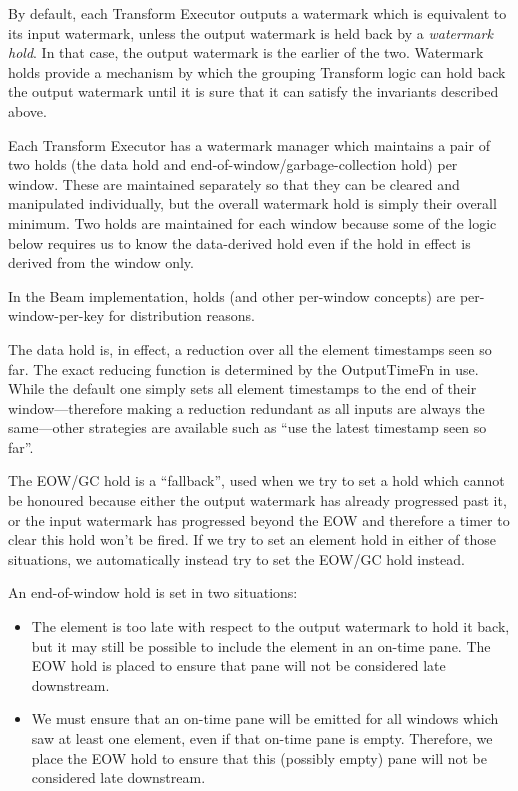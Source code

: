 By default, each Transform Executor outputs a watermark which is equivalent to its input watermark, unless the output watermark is held back by a \emph{watermark hold}.
In that case, the output watermark is the earlier of the two.
Watermark holds provide a mechanism by which the grouping Transform logic can hold back the output watermark until it is sure that it can satisfy the invariants described above.

Each Transform Executor has a watermark manager which maintains a pair of two holds (the data hold and end-of-window/garbage-collection hold) per window\footnotemark.
These are maintained separately so that they can be cleared and manipulated individually, but the overall watermark hold is simply their overall minimum.
Two holds are maintained for each window because some of the logic below requires us to know the data-derived hold even if the hold in effect is derived from the window only.

\footnotetext
{
In the Beam implementation, holds (and other per-window concepts) are per-window-per-key for distribution reasons.
}

The data hold is, in effect, a reduction over all the element timestamps seen so far.
The exact reducing function is determined by the OutputTimeFn in use.
While the default one simply sets all element timestamps to the end of their window---therefore making a reduction redundant as all inputs are always the same---other strategies are available such as ``use the latest timestamp seen so far''.


The EOW/GC hold is a ``fallback'', used when we try to set a hold which cannot be honoured because either the output watermark has already progressed past it, or the input watermark has progressed beyond the EOW and therefore a timer to clear this hold won't be fired.
If we try to set an element hold in either of those situations, we automatically instead try to set the EOW/GC hold instead.

An end-of-window hold is set in two situations:
\begin{itemize}
	\item The element is too late with respect to the output watermark to hold it back, but it may still be possible to include the element in an on-time pane.
	The EOW hold is placed to ensure that pane will not be considered late downstream.
	\item We must ensure that an on-time pane will be emitted for all windows which saw at least one element, even if that on-time pane is empty.
	Therefore, we place the EOW hold to ensure that this (possibly empty) pane will not be considered late downstream.
\end{itemize}

